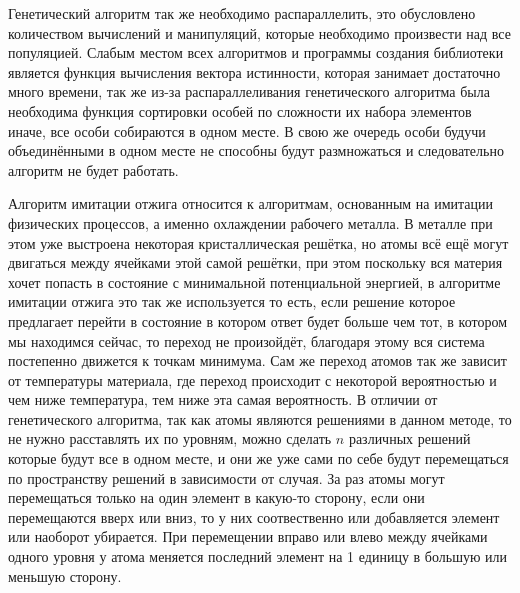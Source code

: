 \documentclass[14pt]{extarticle} %
\begin{document}
Генетический алгоритм так же необходимо распараллелить, это обусловлено количеством вычислений и манипуляций, которые необходимо произвести над все популяцией. Слабым местом всех алгоритмов и программы создания библиотеки является функция вычисления вектора истинности, которая занимает достаточно много времени, так же из-за распараллеливания генетического алгоритма была необходима функция сортировки особей по сложности их набора элементов иначе, все особи собираются в одном месте. В свою же очередь особи будучи объединёнными в одном месте не способны будут размножаться и следовательно алгоритм не будет работать.




Алгоритм имитации отжига  относится к алгоритмам, основанным на имитации физических процессов, а именно охлаждении рабочего металла. В металле при этом уже выстроена некоторая кристаллическая решётка, но атомы всё ещё могут двигаться между ячейками этой самой решётки, при этом поскольку вся материя хочет попасть в состояние с минимальной потенциальной энергией, в алгоритме имитации отжига это так же используется то есть, если решение которое предлагает перейти в состояние в котором ответ будет больше чем тот, в котором мы находимся сейчас, то переход не произойдёт, благодаря этому вся система постепенно движется к точкам минимума. Сам же переход атомов так же зависит от температуры материала, где переход происходит с некоторой вероятностью и чем ниже температура, тем ниже эта самая вероятность.
В отличии от генетического алгоритма, так как атомы являются решениями в данном методе, то не нужно расставлять их по уровням, можно сделать $n$ различных решений которые будут все в одном месте, и они же уже сами по себе будут перемещаться по пространству решений в зависимости от случая. За раз атомы могут перемещаться только на один элемент в какую-то сторону, если они перемещаются вверх или вниз, то у них соотвественно или добавляется элемент или наоборот убирается. При перемещении вправо или влево между ячейками одного уровня у атома меняется последний элемент на 1 единицу в большую или меньшую сторону.
\end{document}
